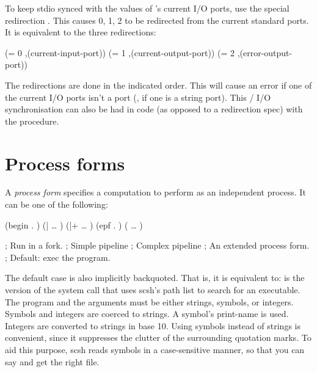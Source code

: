 To keep stdio synced with the values of {\Scheme}'s current I/O ports,
use the special redirection .
This causes 0, 1, 2 to be redirected from the current {\Scheme} standard ports.
It is equivalent to the three redirections:
\begin{code}
(= 0 ,(current-input-port))
(= 1 ,(current-output-port))
(= 2 ,(error-output-port))\end{code}
%
The redirections are done in the indicated order.  This will cause an error if
one of the current I/O ports isn't a {\Unix} port (\eg, if one is a string
port).
This {\Scheme}/{\Unix} I/O synchronisation can also be had in {\Scheme} code 
(as opposed to a redirection spec) with the 
procedure.

\section{Process forms}
A \emph{process form} specifies a computation to perform as an independent
{\Unix} process. It can be one of the following:
%
\begin{leftinset}
\begin{codebox}
(begin . )     
(|  {\ldots} )          
(|+   {\ldots} )      
(epf . )                       
(  {\ldots} )       
\end{codebox}
\qquad
\begin{codebox}
; Run  in a fork.
; Simple pipeline
; Complex pipeline
; An extended process form.
; Default: exec the program.
\end{codebox}
\end{leftinset}
%
The default case  
is also implicitly backquoted.
That is, it is equivalent to:
%
%
 is the version of the  system call that 
uses scsh's path list to search for an executable.
The program and the arguments must be either strings, symbols, or integers.
Symbols and integers are coerced to strings.
A symbol's print-name is used.
Integers are converted to strings in base 10.
Using symbols instead of strings is convenient, since it suppresses the
clutter of the surrounding  quotation marks.
To aid this purpose, scsh reads symbols in a case-sensitive manner, 
so that you can say
and get the right file.

